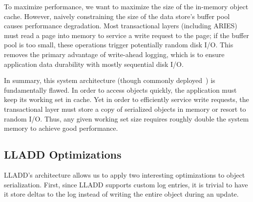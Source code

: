 \documentclass[10pt,letterpaper,twocolumn,english]{article}
\newcommand{\yad}{LLADD\xspace}
\begin{document}
To maximize performance, we want to maximize the size of the in-memory object cache.
However, naively constraining the size of the data store's buffer pool
causes performance degradation. Most transactional layers 
(including ARIES) must read a page
into memory to service a write request to the page; if the buffer pool
is too small, these operations trigger potentially random disk I/O. 
This removes the primary
advantage of write-ahead logging, which is to ensure application data
durability with mostly sequential disk I/O.

In summary, this system architecture (though commonly
deployed~\cite{hibernate,postgres}) is fundamentally
flawed.  In order to access objects quickly, the application must keep
its working set in cache.  Yet in order to efficiently service write 
requests, the
transactional layer must store a copy of serialized objects
in memory or resort to random I/O.  
Thus, any given working set size requires roughly double the system
memory to achieve good performance.

\subsection{\yad Optimizations}

\label{version-pages}

\yad's architecture allows us to apply two interesting optimizations
to object serialization.  First, since \yad supports
custom log entries, it is trivial to have it store deltas to
the log instead of writing the entire object during an update.


\end{document}
